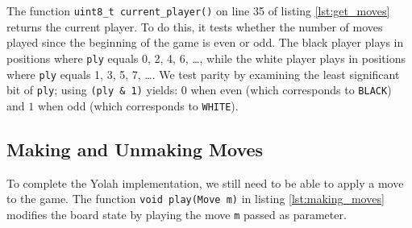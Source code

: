 \documentclass[12pt,a4paper,twoside,openright]{book}
\begin{document}
The function \texttt{uint8_t current_player()} on line 35 of listing \ref{lst:get_moves} returns the current player. To do this, it tests whether the number of moves played since the beginning of the game is even or odd. The black player plays in positions where \texttt{ply} equals 0, 2, 4, 6, \ldots, while the white player plays in positions where \texttt{ply} equals 1, 3, 5, 7, \ldots. We test parity by examining the least significant bit of \texttt{ply}; using \texttt{(ply & 1)} yields: $0$ when even (which corresponds to \texttt{BLACK}) and $1$ when odd (which corresponds to \texttt{WHITE}). 

\subsection{Making and Unmaking Moves}
\label{subsection:making_and_unmaking_moves}

To complete the Yolah implementation, we still need to be able to apply a move to the game. The function \texttt{void play(Move m)} in listing \ref{lst:making_moves} modifies the board state by playing the move \texttt{m} passed as parameter.
\end{document}
